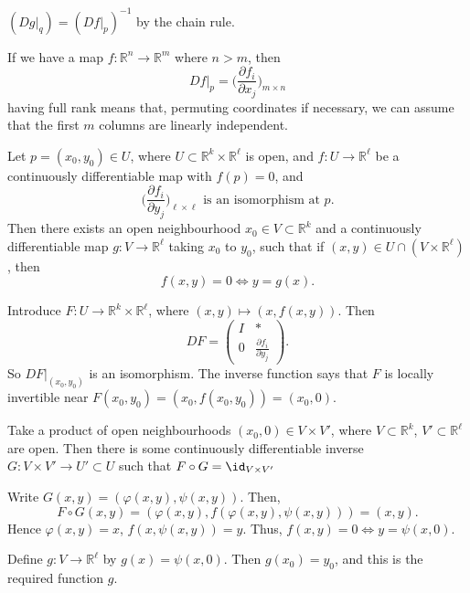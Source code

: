 \documentclass[12pt]{article}
\begin{document}
\begin{remark}
	$(Dg|_q) = (Df|_p)^{-1}$ by the chain rule.
\end{remark}

If we have a map $f : \mathbb{R}^{n} \to \mathbb{R}^{m}$ where $n > m$, then
\[
Df|_p = \biggl( \frac{\partial f_i}{\partial x_j} \biggr)_{m \times n}
\]
having full rank means that, permuting coordinates if necessary, we can assume that the first $m$ columns are linearly independent.

\begin{theorem}
	Let $p = (x_0, y_0) \in U$, where $U \subset \mathbb{R}^{k} \times \mathbb{R}^{\ell}$ is open, and $f : U \to \mathbb{R}^{\ell}$ be a continuously differentiable map with $f(p) = 0$, and
	\[
		\biggl( \frac{\partial f_i}{\partial y_j} \biggr)_{\ell \times \ell} \text{ is an isomorphism at } p
	.\]
	Then there exists an open neighbourhood $x_0 \in V \subset \mathbb{R}^{k}$ and a continuously differentiable map $g : V \to \mathbb{R}^{\ell}$ taking $x_0$ to $y_0$, such that if $(x, y) \in U \cap (V \times \mathbb{R}^{\ell})$, then
	\[
	f(x, y) = 0 \iff y = g(x)
	.\]
\end{theorem}

\begin{proofbox}
	Introduce $F: U \to \mathbb{R}^{k} \times \mathbb{R}^{\ell}$, where $(x, y) \mapsto (x, f(x, y))$. Then
	\[
	DF =
	\begin{pmatrix}
		I & \ast \\
		0 & \frac{\partial f_i}{\partial y_j}
	\end{pmatrix}
	.\]
	So $DF|_{(x_0, y_0)}$ is an isomorphism. The inverse function says that $F$ is locally invertible near $F(x_0, y_0) = (x_0, f(x_0, y_0)) = (x_0, 0)$.

	Take a product of open neighbourhoods $(x_0,0) \in V \times V'$, where $V \subset \mathbb{R}^{k}$, $V' \subset \mathbb{R}^{\ell}$ are open. Then there is some continuously differentiable inverse $G : V \times V' \to U' \subset U$ such that $F \circ G = \id_{V \times V'}$ 

	Write $G(x, y) = (\varphi(x,y), \psi(x, y))$. Then,
	\[
	F \circ G(x, y) = (\varphi(x, y), f(\varphi(x, y), \psi(x,y))) = (x, y)
	.\]
	Hence $\varphi(x, y) = x$, $f(x, \psi(x, y)) = y$. Thus, $f(x, y) = 0 \iff y = \psi(x, 0)$.

	Define $g : V \to \mathbb{R}^{\ell}$ by $g(x) = \psi(x,0)$. Then $g(x_0) = y_0$, and this is the required function $g$.
\end{proofbox}
\end{document}
